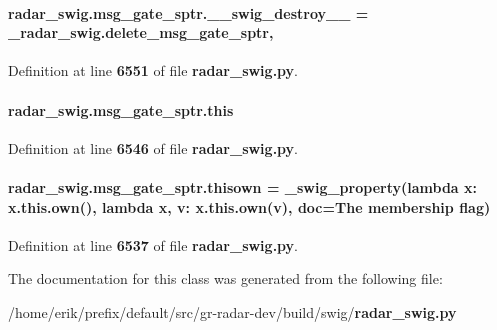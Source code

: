 \paragraph[{\+\_\+\+\_\+swig\+\_\+destroy\+\_\+\+\_\+}]{\setlength{\rightskip}{0pt plus 5cm}radar\+\_\+swig.\+msg\+\_\+gate\+\_\+sptr.\+\_\+\+\_\+swig\+\_\+destroy\+\_\+\+\_\+ = \+\_\+radar\+\_\+swig.\+delete\+\_\+msg\+\_\+gate\+\_\+sptr\hspace{0.3cm}{\ttfamily [static]}, {\ttfamily [private]}}\label{classradar__swig_1_1msg__gate__sptr_afde1b24e98add59c426fa4d507569542}


Definition at line {\bf 6551} of file {\bf radar\+\_\+swig.\+py}.

\paragraph[{this}]{\setlength{\rightskip}{0pt plus 5cm}radar\+\_\+swig.\+msg\+\_\+gate\+\_\+sptr.\+this}\label{classradar__swig_1_1msg__gate__sptr_aed72586dd8f5b84fd5ff6f351de74911}


Definition at line {\bf 6546} of file {\bf radar\+\_\+swig.\+py}.

\paragraph[{thisown}]{\setlength{\rightskip}{0pt plus 5cm}radar\+\_\+swig.\+msg\+\_\+gate\+\_\+sptr.\+thisown = {\bf \+\_\+swig\+\_\+property}(lambda x\+: x.\+this.\+own(), lambda {\bf x}, v\+: x.\+this.\+own(v), doc=\textquotesingle{}The membership flag\textquotesingle{})\hspace{0.3cm}{\ttfamily [static]}}\label{classradar__swig_1_1msg__gate__sptr_a7f438c61062b2a8cc9ea5d18085b0475}


Definition at line {\bf 6537} of file {\bf radar\+\_\+swig.\+py}.



The documentation for this class was generated from the following file\+:\begin{DoxyCompactItemize}
\item 
/home/erik/prefix/default/src/gr-\/radar-\/dev/build/swig/{\bf radar\+\_\+swig.\+py}\end{DoxyCompactItemize}
